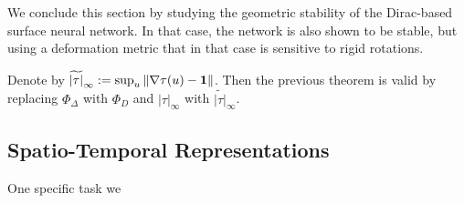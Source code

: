 We conclude this section by studying the geometric stability of the Dirac-based surface neural network. 
In that case, the network is also shown to be stable, but using a deformation metric that in that case 
is sensitive to rigid rotations. 
\begin{theorem}
\label{diractheo}
Denote by $\widetilde{| \tau |}_\infty := \sup_u \| \nabla \tau(u) - {\bf 1} \|$. Then 
the previous theorem is valid by replacing $\Phi_\Delta$ with $\Phi_D$ and $| \tau |_\infty$ with $\widetilde{| \tau |}_\infty$.
\end{theorem}

\subsection{Spatio-Temporal Representations}

One specific task we 


\cite{michaelmathieu}







